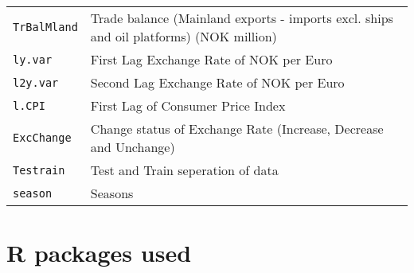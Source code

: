\documentclass[12pt, lot, lof]{thesis}\usepackage[]{graphicx}\usepackage[]{color}
\begin{document}
\begin{tabularx}{\textwidth}{lX}
  \texttt{TrBalMland} & Trade balance (Mainland exports - imports excl. ships and oil platforms) (NOK million) \\ 
  \texttt{ly.var} & First Lag Exchange Rate of NOK per Euro \\ 
  \texttt{l2y.var} & Second Lag Exchange Rate of NOK per Euro \\ 
  \texttt{l.CPI} & First Lag of Consumer Price Index \\ 
  \texttt{ExcChange} & Change status of Exchange Rate (Increase, Decrease and Unchange) \\ 
  \texttt{Testrain} & Test and Train seperation of data \\ 
  \texttt{season} & Seasons \\ 
   \bottomrule
\end{tabularx}



  


\chapter{R packages used}
\label{ch:rpkgsUsed}
\end{document}
